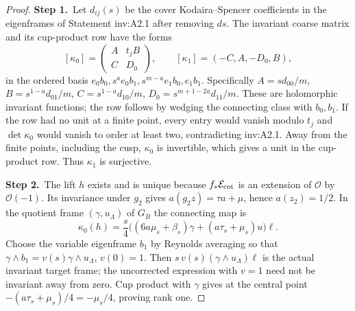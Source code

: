 \documentclass[11pt,a4paper]{article}
\theoremstyle{plain}
\theoremstyle{definition}
\newcommand{\C}{\mathbb C}
\begin{document}
\begin{proof}
\par\smallskip\noindent\textbf{Step 1.}\ Let $d_{ij}(s)$ be the cover Kodaira--Spencer coefficients in the
eigenframes of Statement inv:A2.1 after removing $ds$.
The invariant coarse matrix and its cup-product row have the forms
\[
[\kappa_0]=\begin{pmatrix}A&t_jB\\C&D_0\end{pmatrix},\qquad
[\kappa_1]=(-C,A,-D_0,B),
\]
in the ordered basis
$e_0b_0,s^ae_0b_1,s^{m-a}e_1b_0,e_1b_1$.  Specifically
$A=sd_{00}/m$, $B=s^{1-a}d_{01}/m$,
$C=s^{1-a}d_{10}/m$, $D_0=s^{m+1-2a}d_{11}/m$.
These are holomorphic invariant functions; the row follows by
wedging the connecting class with $b_0,b_1$.
If the row had no unit at a finite point, every entry would vanish
modulo $t_j$ and $\det\kappa_0$ would vanish to order at least two,
contradicting inv:A2.1.  Away from the finite points, including the cusp,
$\kappa_0$ is invertible, which gives a unit in the cup-product row.
Thus $\kappa_1$ is surjective.

\par\smallskip\noindent\textbf{Step 2.}\ The lift $h$ exists and is unique because $f_*\mathcal E_{\rm cot}$ is an
extension of $\mathcal O$ by $\mathcal O(-1)$.  Its invariance under $g_2$ gives
$a(g_2z)=\tau a+\mu$, hence $a(z_2)=1/2$.
In the quotient frame $(\gamma,u_{\Lambda})$ of $G_B$ the connecting map is
\[
\kappa_0(h)=\frac{s}{4}
\bigl((6a\mu_s+\beta_s)\gamma+(a\tau_s+\mu_s)u\bigr)\ell.
\]
Choose the variable eigenframe $b_1$ by Reynolds averaging so that
$\gamma\wedge b_1=v(s)\gamma\wedge u_{\Lambda}$, $v(0)=1$.
Then $s\,v(s)(\gamma\wedge u_{\Lambda})\ell$ is the actual invariant
target frame; the uncorrected expression with $v=1$ need not be
invariant away from zero.  Cup product with $\gamma$ gives at the
central point $-(a\tau_s+\mu_s)/4=-\mu_s/4$, proving rank one.


\end{proof}
\end{document}
